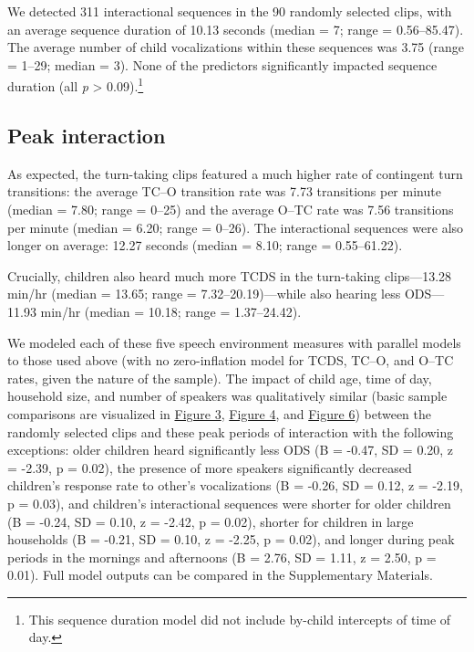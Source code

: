 \documentclass[floatsintext,man]{apa6}
\theoremstyle{definition}
\theoremstyle{definition}
\theoremstyle{definition}
\theoremstyle{remark}
\begin{document}
We detected 311 interactional sequences in the 90 randomly selected
clips, with an average sequence duration of 10.13 seconds (median = 7;
range = 0.56--85.47). The average number of child vocalizations within
these sequences was 3.75 (range = 1--29; median = 3). None of the
predictors significantly impacted sequence duration (all \emph{p}
\textgreater{} 0.09).\footnote{This sequence duration model did not
  include by-child intercepts of time of day.}

\subsection{Peak interaction}\label{peak-interaction}

As expected, the turn-taking clips featured a much higher rate of
contingent turn transitions: the average TC--O transition rate was 7.73
transitions per minute (median = 7.80; range = 0--25) and the average
O--TC rate was 7.56 transitions per minute (median = 6.20; range =
0--26). The interactional sequences were also longer on average: 12.27
seconds (median = 8.10; range = 0.55--61.22).

Crucially, children also heard much more TCDS in the turn-taking
clips---13.28 min/hr (median = 13.65; range = 7.32--20.19)---while also
hearing less ODS---11.93 min/hr (median = 10.18; range = 1.37--24.42).

We modeled each of these five speech environment measures with parallel
models to those used above (with no zero-inflation model for TCDS,
TC--O, and O--TC rates, given the nature of the sample). The impact of
child age, time of day, household size, and number of speakers was
qualitatively similar (basic sample comparisons are visualized in
\protect\hyperlink{fig3}{Figure 3}, \protect\hyperlink{fig4}{Figure 4},
and \protect\hyperlink{fig6}{Figure 6}) between the randomly selected
clips and these peak periods of interaction with the following
exceptions: older children heard significantly less ODS (B = -0.47, SD =
0.20, z = -2.39, p = 0.02), the presence of more speakers significantly
decreased children's response rate to other's vocalizations (B = -0.26,
SD = 0.12, z = -2.19, p = 0.03), and children's interactional sequences
were shorter for older children (B = -0.24, SD = 0.10, z = -2.42, p =
0.02), shorter for children in large households (B = -0.21, SD = 0.10, z
= -2.25, p = 0.02), and longer during peak periods in the mornings and
afternoons (B = 2.76, SD = 1.11, z = 2.50, p = 0.01). Full model outputs
can be compared in the Supplementary Materials.
\end{document}
